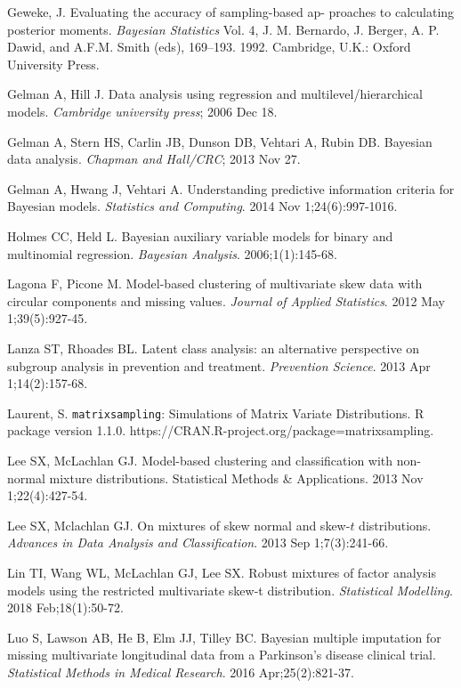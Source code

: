\documentclass[useAMS,referee]{biom}
\begin{document}
\begin{thebibliography}{}
\bibitem{ } Geweke, J. Evaluating the accuracy of sampling-based ap- proaches to calculating posterior moments. \textit{Bayesian Statistics} Vol. 4, J. M. Bernardo, J. Berger, A. P. Dawid, and A.F.M. Smith (eds), 169–193. 1992. Cambridge, U.K.: Oxford University Press.

\bibitem{ } Gelman A, Hill J. Data analysis using regression and multilevel/hierarchical models. \textit{Cambridge university press}; 2006 Dec 18.

\bibitem{ } Gelman A, Stern HS, Carlin JB, Dunson DB, Vehtari A, Rubin DB. Bayesian data analysis. \textit{Chapman and Hall/CRC}; 2013 Nov 27.

\bibitem{ } Gelman A, Hwang J, Vehtari A. Understanding predictive information criteria for Bayesian models. \textit{Statistics and Computing}. 2014 Nov 1;24(6):997-1016.

\bibitem{ } Holmes CC, Held L. Bayesian auxiliary variable models for binary and multinomial regression. \textit{Bayesian Analysis}. 2006;1(1):145-68.

\bibitem{ } Lagona F, Picone M. Model-based clustering of multivariate skew data with circular components and missing values. \textit{Journal of Applied Statistics}. 2012 May 1;39(5):927-45.

\bibitem{ } Lanza ST, Rhoades BL. Latent class analysis: an alternative perspective on subgroup analysis in prevention and treatment. \textit{Prevention Science}. 2013 Apr 1;14(2):157-68.

\bibitem{ } Laurent, S. \texttt{matrixsampling}: Simulations of Matrix Variate Distributions. R package version 1.1.0.
https://CRAN.R-project.org/package=matrixsampling.

\bibitem{ } Lee SX, McLachlan GJ. Model-based clustering and classification with non-normal mixture distributions. Statistical Methods \& Applications. 2013 Nov 1;22(4):427-54.

\bibitem{ } Lee SX, Mclachlan GJ. On mixtures of skew normal and skew-$t$ distributions. \textit{Advances in Data Analysis and Classification}. 2013 Sep 1;7(3):241-66.

\bibitem{ } Lin TI, Wang WL, McLachlan GJ, Lee SX. Robust mixtures of factor analysis models using the restricted multivariate skew-t distribution. \textit{Statistical Modelling}. 2018 Feb;18(1):50-72.

\bibitem{ } Luo S, Lawson AB, He B, Elm JJ, Tilley BC. Bayesian multiple imputation for missing multivariate longitudinal data from a Parkinson's disease clinical trial. \textit{Statistical Methods in Medical Research}. 2016 Apr;25(2):821-37.


\end{thebibliography}
\end{document}
